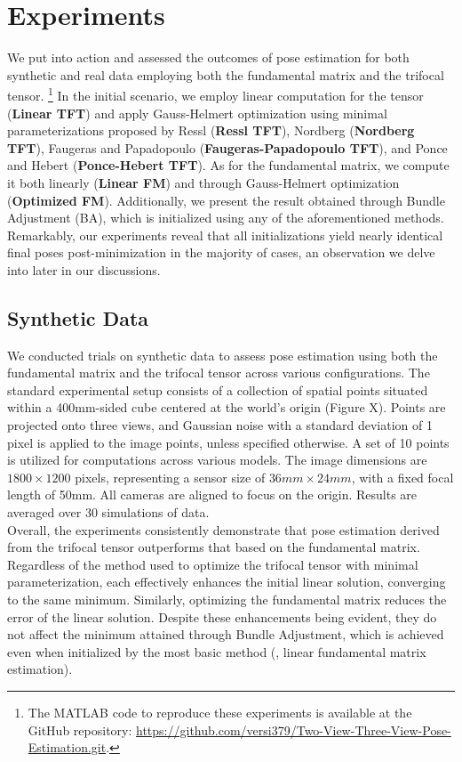 \section{Experiments}\label{sec:experiments}
We put into action and assessed the outcomes of pose estimation for both synthetic and real data employing both the fundamental matrix and the trifocal tensor. \footnote{The MATLAB code to reproduce these experiments is available at the GitHub repository: \href{https://github.com/versi379/Two-View-Three-View-Pose-Estimation.git}{https://github.com/versi379/Two-View-Three-View-Pose-Estimation.git}.} In the initial scenario, we employ linear computation for the tensor (\textbf{Linear TFT}) and apply Gauss-Helmert optimization using minimal parameterizations proposed by Ressl (\textbf{Ressl TFT}), Nordberg (\textbf{Nordberg TFT}), Faugeras and Papadopoulo (\textbf{Faugeras-Papadopoulo TFT}), and Ponce and Hebert (\textbf{Ponce-Hebert TFT}). As for the fundamental matrix, we compute it both linearly (\textbf{Linear FM}) and through Gauss-Helmert optimization (\textbf{Optimized FM}). Additionally, we present the result obtained through Bundle Adjustment (BA), which is initialized using any of the aforementioned methods. Remarkably, our experiments reveal that all initializations yield nearly identical final poses post-minimization in the majority of cases, an observation we delve into later in our discussions.

\subsection{Synthetic Data}
We conducted trials on synthetic data to assess pose estimation using both the fundamental matrix and the trifocal tensor across various configurations. The standard experimental setup consists of a collection of spatial points situated within a 400mm-sided cube centered at the world's origin (Figure X). Points are projected onto three views, and Gaussian noise with a standard deviation of 1 pixel is applied to the image points, unless specified otherwise. A set of 10 points is utilized for computations across various models. The image dimensions are \( 1800 \times 1200 \) pixels, representing a sensor size of \( 36mm \times 24mm \), with a fixed focal length of 50mm. All cameras are aligned to focus on the origin. Results are averaged over 30 simulations of data.\\

Overall, the experiments consistently demonstrate that pose estimation derived from the trifocal tensor outperforms that based on the fundamental matrix. Regardless of the method used to optimize the trifocal tensor with minimal parameterization, each effectively enhances the initial linear solution, converging to the same minimum. Similarly, optimizing the fundamental matrix reduces the error of the linear solution. Despite these enhancements being evident, they do not affect the minimum attained through Bundle Adjustment, which is achieved even when initialized by the most basic method (\ie, linear fundamental matrix estimation).\\

